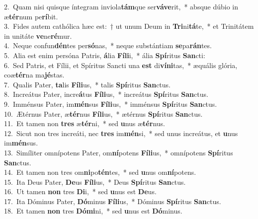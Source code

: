 {2.~}Quam nisi quisque íntegram inviola\textbf{tám}que ser\textbf{vá}\textbf{ve}rit,~* absque dúbio in æ\textbf{tér}num pe\textbf{rí}bit.\\
{3.~}Fides autem cathólica hæc est:~† ut unum Deum in \textbf{Tri}ni\textbf{tá}te,~* et Trinitátem in unitáte \textbf{ve}ne\textbf{ré}mur.\\
{4.~}Neque confun\textbf{dén}tes per\textbf{só}nas,~* neque substántiam \textbf{se}pa\textbf{rán}tes.\\
{5.~}Alia est enim persóna Patris, \textbf{á}lia \textbf{Fí}\textbf{li}i,~* ália \textbf{Spí}ritus \textbf{San}cti:\\
{6.~}Sed Patris, et Fílii, et Spíritus Sancti una \textbf{est} di\textbf{ví}\textbf{ni}tas,~* æquális glória, coæ\textbf{tér}na ma\textbf{jé}stas.\\
{7.~}Qualis Pater, \textbf{ta}lis \textbf{Fí}\textbf{li}us,~* talis \textbf{Spí}ritus \textbf{San}ctus.\\
{8.~}Increátus Pater, incre\textbf{á}tus \textbf{Fí}\textbf{li}us,~* increátus \textbf{Spí}ritus \textbf{San}ctus.\\
{9.~}Imménsus Pater, im\textbf{mén}sus \textbf{Fí}\textbf{li}us,~* imménsus \textbf{Spí}ritus \textbf{San}ctus.\\
{10.~}Ætérnus Pater, æ\textbf{tér}nus \textbf{Fí}\textbf{li}us,~* ætérnus \textbf{Spí}ritus \textbf{San}ctus.\\
{11.~}Et tamen non \textbf{tres} æ\textbf{tér}ni,~* sed \textbf{u}nus æ\textbf{tér}nus.\\
{12.~}Sicut non tres increáti, nec \textbf{tres} im\textbf{mén}si,~* sed unus increátus, et \textbf{u}nus im\textbf{mén}sus.\\
{13.~}Simíliter omnípotens Pater, om\textbf{ní}potens \textbf{Fí}\textbf{li}us,~* omnípotens \textbf{Spí}ritus \textbf{San}ctus.\\
{14.~}Et tamen non tres om\textbf{ni}po\textbf{tén}tes,~* sed \textbf{u}nus om\textbf{ní}potens.\\
{15.~}Ita Deus Pater, \textbf{De}us \textbf{Fí}\textbf{li}us,~* Deus \textbf{Spí}ritus \textbf{San}ctus.\\
{16.~}Ut tamen \textbf{non} tres \textbf{Di}i,~* sed \textbf{u}nus est \textbf{De}us.\\
{17.~}Ita Dóminus Pater, \textbf{Dó}minus \textbf{Fí}\textbf{li}us,~* Dóminus \textbf{Spí}ritus \textbf{San}ctus.\\
{18.~}Et tamen \textbf{non} tres \textbf{Dó}\textbf{mi}ni,~* sed \textbf{u}nus est \textbf{Dó}minus.\\
